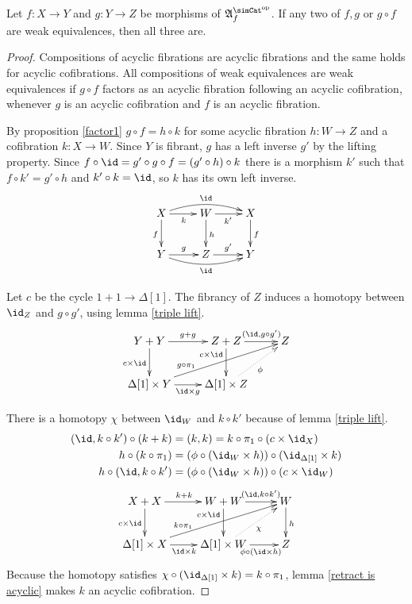 \documentclass{tac}
\newcommand\dual{^{\mathrm{op}}}
\newcommand\s{^{\simCat\dual}}
\newcommand\of{:}
\newcommand\simplex\Delta
\newcommand\f{_f}
\newcommand\ambient{\mathfrak A}
\begin{document}
\begin{lemma}[2-out-of-3] Let $f\of X\to Y$ and $g\of Y\to Z$ be morphisms of $\ambient\s\f$. If any two of $f,g$ or $g\circ f$ are weak equivalences, then all three are. \label{toot}\end{lemma}

\begin{proof}
Compositions of acyclic fibrations are acyclic fibrations and the same holds for acyclic cofibrations. All compositions of weak equivalences are weak equivalences if $g\circ f$ factors as an acyclic fibration following an acyclic cofibration, whenever $g$ is an acyclic cofibration and $f$ is an acyclic fibration.

By proposition \ref{factor1} $g\circ f=h\circ k$ for some acyclic fibration $h\of W\to Z$ and a cofibration $k\of X\to W$. Since $Y$ is fibrant, $g$ has a left inverse $g'$ by the lifting property. Since $f \circ \id = g'\circ g\circ f= (g'\circ h)\circ k$ there is a morphism $k'$ such that $f\circ k' = g'\circ h$ and $k'\circ k = \id$, so $k$ has its own left inverse.
\[\xymatrix{
X\ar[d]_f \ar[r]_{k} \ar@/^2ex/[rr]^{\id} & W\ar[d]^h \ar[r]_{k'} & X\ar[d]^f\\
Y \ar[r]^{g} \ar@/_2ex/[rr]_{\id} & Z \ar[r]^{g'} & Y
}\]

Let $c$ be the cycle $1+1\to\simplex[1]$. The fibrancy of $Z$ induces a homotopy between $\id_Z$ and $g\circ g'$, using lemma \ref{triple lift}.
\[\xymatrix{
Y+Y\ar[r]^{g+g}\ar[d]_{c\times\id} & Z+Z\ar[r]^(.6){(\id,g\circ g')}\ar[d]_(.3){c\times\id} & Z\\
\simplex[1]\times Y\ar[r]_{\id\times g}\ar[urr]^(.3){g\circ\pi_1} & \simplex[1]\times Z\ar@{.>}[ur]_{\phi}
}\]

There is a homotopy $\chi$ between $\id_W$ and $k\circ k'$ because of lemma \ref{triple lift}.
\begin{align*}
(\id, k\circ k')\circ (k+k) &= (k,k) = k\circ \pi_1\circ(c\times\id_X)\\
h\circ (k \circ \pi_1) &= (\phi\circ (\id_W\times h))\circ (\id_{\simplex[1]} \times k)\\
h\circ (\id, k\circ k') &= (\phi\circ (\id_W\times h))\circ (c\times \id_W)
\end{align*}
\[\xymatrix{
X+X\ar[d]_{c\times \id}\ar[r]^{k+k} & W+W\ar[d]_(.3){c\times \id}\ar[r]^(.6){(\id,k\circ k')} & W\ar[d]^h\\
\simplex[1]\times X\ar[r]_{\id\times k} \ar[urr]^(.3){k\circ \pi_1}  & \simplex[1]\times W\ar[r]_(.6){\phi\circ (\id\times h)} \ar@{.>}[ur]_\chi & Z
}\]
Because the homotopy satisfies $\chi\circ(\id_{\simplex[1]}\times k) = k\circ \pi_1$, lemma \ref{retract is acyclic} makes $k$ an acyclic cofibration.


\end{proof}
\end{document}
